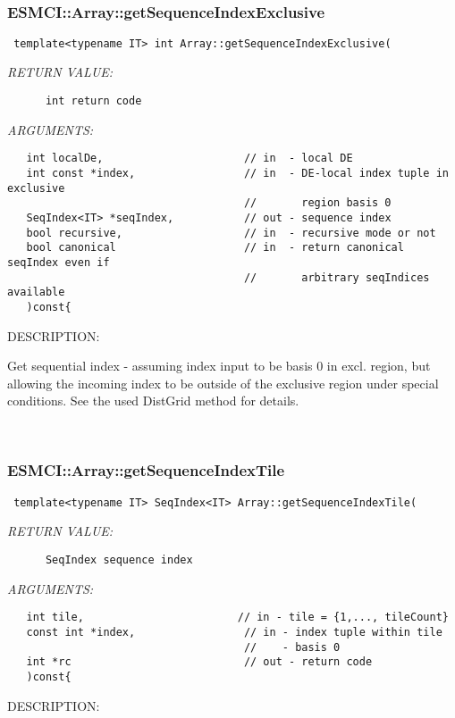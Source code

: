 \mbox{}\hrulefill\
 
\subsubsection [ESMCI::Array::getSequenceIndexExclusive] {ESMCI::Array::getSequenceIndexExclusive}


  
\begin{verbatim} template<typename IT> int Array::getSequenceIndexExclusive(\end{verbatim}{\em RETURN VALUE:}
\begin{verbatim}      int return code\end{verbatim}{\em ARGUMENTS:}
\begin{verbatim}   int localDe,                      // in  - local DE
   int const *index,                 // in  - DE-local index tuple in exclusive
                                     //       region basis 0
   SeqIndex<IT> *seqIndex,           // out - sequence index
   bool recursive,                   // in  - recursive mode or not
   bool canonical                    // in  - return canonical seqIndex even if
                                     //       arbitrary seqIndices available
   )const{\end{verbatim}
{\sf DESCRIPTION:\\ }


      Get sequential index - assuming index input to be basis 0 in excl. region,
      but allowing the incoming index to be outside of the exclusive region
      under special conditions. See the used DistGrid method for details.
   
 
\mbox{}\hrulefill\
 
\subsubsection [ESMCI::Array::getSequenceIndexTile] {ESMCI::Array::getSequenceIndexTile}


  
\begin{verbatim} template<typename IT> SeqIndex<IT> Array::getSequenceIndexTile(\end{verbatim}{\em RETURN VALUE:}
\begin{verbatim}      SeqIndex sequence index\end{verbatim}{\em ARGUMENTS:}
\begin{verbatim}   int tile,                        // in - tile = {1,..., tileCount}
   const int *index,                 // in - index tuple within tile
                                     //    - basis 0
   int *rc                           // out - return code
   )const{\end{verbatim}
{\sf DESCRIPTION:\\ }


